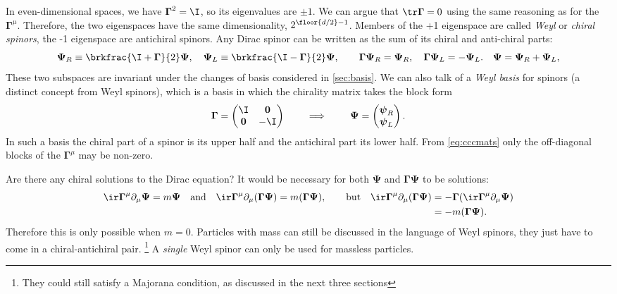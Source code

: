\documentclass[11pt]{article}
\newcommand{\Gammab}{\boldsymbol{\Gamma}}
\newcommand{\psib}{\boldsymbol{\psi}}
\newcommand{\Psib}{\boldsymbol{\Psi}}
\begin{document}
In even-dimensional spaces, we have $\Gammab^2 = \I$, so its eigenvalues are $\pm 1$.
We can argue that $\tr \Gammab = 0$ using the same reasoning as for the $\Gammab^\mu$.
Therefore, the two eigenspaces have the same dimensionality, $2^{\floor{d/2}-1}$.
Members of the +1 eigenspace are called \emph{Weyl} or \emph{chiral spinors}, the -1 eigenspace are antichiral spinors.
Any Dirac spinor can be written as the sum of its chiral and anti-chiral parts:
%
\begin{equation}\label{eq:Weylanti}
  \Psib_R \equiv \brkfrac{\I+\Gammab}{2} \Psib,
  \quad
  \Psib_L \equiv \brkfrac{\I-\Gammab}{2} \Psib,
  \qquad
  \Gammab \Psib_R = \Psib_R,
  \quad
  \Gammab \Psib_L = - \Psib_L.
  \quad
  \Psib = \Psib_R + \Psib_L,
\end{equation}
%
These two subspaces are invariant under the changes of basis considered in \cref{sec:basis}.
We can also talk of a \emph{Weyl basis} for spinors (a distinct concept from Weyl spinors), which is a basis in which the chirality matrix takes the block form
%
\begin{equation}\label{eq:weylbasis}
  \Gammab = \begin{pmatrix}
              \I         & \mathbf{0} \\
              \mathbf{0} & -\I        \\
            \end{pmatrix}
  \qquad
  \implies
  \qquad
  \Psib = \begin{pmatrix}
            \psib_R \\
            \psib_L \\
          \end{pmatrix}
  .
\end{equation}
%
In such a basis the chiral part of a spinor is its upper half and the antichiral part its lower half.
From \cref{eq:cccmats} only the off-diagonal blocks of the $\Gammab^\mu$ may be non-zero.

Are there any chiral solutions to the Dirac equation?
It would be necessary for both $\Psib$ and $\Gammab \Psib$ to be solutions:
%
\begin{equation*}
  \ir \Gammab^\mu \partial_\mu \Psib = m \Psib
  \quad \text{and} \quad
  \ir \Gammab^\mu \partial_\mu (\Gammab \Psib) = m (\Gammab \Psib),
  \qquad \text{but} \quad
\begin{aligned}[t]
  \ir \Gammab^\mu \partial_\mu (\Gammab \Psib)
    &= - \Gammab (\ir \Gammab^\mu \partial_\mu \Psib) \\
    &= - m (\Gammab \Psib).
\end{aligned}
\end{equation*}
%
Therefore this is only possible when $m=0$.
Particles with mass can still be discussed in the language of Weyl spinors, they just have to come in a chiral-antichiral pair.%
\footnote{They could still satisfy a Majorana condition, as discussed in the next three sections}
A \emph{single} Weyl spinor can only be used for massless particles.
\end{document}
